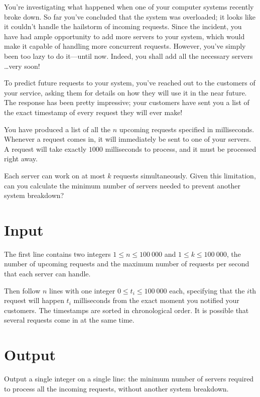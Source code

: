 
You're investigating what happened when one of your computer systems recently broke down.
So far you've concluded that the system was overloaded; it looks like it
couldn't handle the hailstorm of incoming requests. Since the incident, you
have had ample opportunity to add more servers to
your system, which would make it capable of handling more concurrent requests. However,
you've simply been too lazy to do it---until now. Indeed, you shall add all the
necessary servers \dots very soon!

To predict future requests to your system, you've
reached out to the customers of your service, asking them for details on how they
will use it in the near future. The response has been pretty impressive; your customers have sent you
a list of the exact timestamp of every request they will ever make!

You have produced a list of all the $n$ upcoming requests specified in milliseconds.
Whenever a request comes in, it will immediately be sent to one of your servers.
A request will take exactly $1000$ milliseconds to process, and it must be processed
right away.

Each server can work on at most $k$ requests simultaneously. Given this
limitation, can you calculate the minimum number of servers needed to prevent
another system breakdown?

\section*{Input}
The first line contains two integers $1 \le n \le 100\ 000$ and $1 \le k \le
100\ 000$, the number of upcoming requests and the maximum number of requests per
second that each server can handle.

Then follow $n$ lines with one integer $0 \le t_i \le 100\ 000$ each, specifying that
the $i$th request will happen $t_i$ milliseconds from the exact moment you notified your customers.
The timestamps
are sorted in chronological order. It is possible that several requests
come in at the same time.

\section*{Output}
Output a single integer on a single line: the minimum number of servers required
to process all the incoming requests, without another system breakdown.
